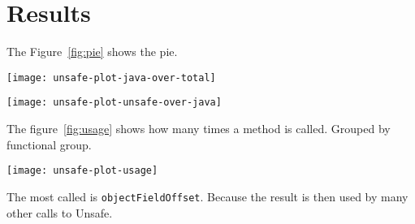 
\section{Results} \label{sec:results}

The Figure~\ref{fig:pie} shows the pie.

\begin{figure*}[htb]
\centering
\vspace{-1cm}
\texttt{[image: unsafe-plot-java-over-total]}
\caption{Project using unsafe}
\label{fig:pie}
\end{figure*}

\begin{figure*}[htb]
\centering
\vspace{-1cm}
\texttt{[image: unsafe-plot-unsafe-over-java]}
\caption{Project using unsafe}
\label{fig:pie}
\end{figure*}


The figure~\ref{fig:usage} shows how many times a method is called. Grouped by functional group.

\begin{figure*}[htb]
\texttt{[image: unsafe-plot-usage]}
\caption{sun.misc.Unsafe methods usage}
\label{fig:usage}
\end{figure*}

The most called is \texttt{objectFieldOffset}. Because the result is then used by many other calls to Unsafe.




